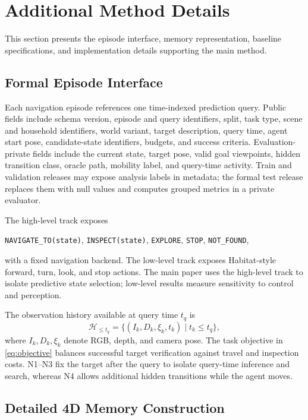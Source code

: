 \section{Additional Method Details}
\label{app:method-details}

This section presents the episode interface, memory representation, baseline
specifications, and implementation details supporting the main method.

\subsection{Formal Episode Interface}
\label{app:episode}

Each navigation episode references one time-indexed prediction query. Public fields include schema version, episode and query identifiers, split, task type, scene and household identifiers, world variant, target description, query time, agent start pose, candidate-state identifiers, budgets, and success criteria. Evaluation-private fields include the current state, target pose, valid goal viewpoints, hidden transition class, oracle path, mobility label, and query-time activity. Train and validation releases may expose analysis labels in metadata; the formal test release replaces them with null values and computes grouped metrics in a private evaluator.

The high-level track exposes
\begin{center}
\texttt{NAVIGATE\_TO(state)}, \texttt{INSPECT(state)}, \texttt{EXPLORE},
\texttt{STOP}, \texttt{NOT\_FOUND},
\end{center}
with a fixed navigation backend. The low-level track exposes Habitat-style forward, turn, look, and stop actions. The main paper uses the high-level track to isolate predictive state selection; low-level results measure sensitivity to control and perception.

The observation history available at query time $t_q$ is
\begin{equation}
\mathcal H_{\leq t_q}=\{(I_k,D_k,\xi_k,t_k)\mid t_k\leq t_q\},
\end{equation}
where $I_k,D_k,\xi_k$ denote RGB, depth, and camera pose. The task objective
in \cref{eq:objective} balances successful target verification against travel
and inspection costs. N1--N3 fix the target after the query to isolate
query-time inference and search, whereas N4 allows additional hidden
transitions while the agent moves.

\subsection{Detailed 4D Memory Construction}
\label{app:memory-details}

